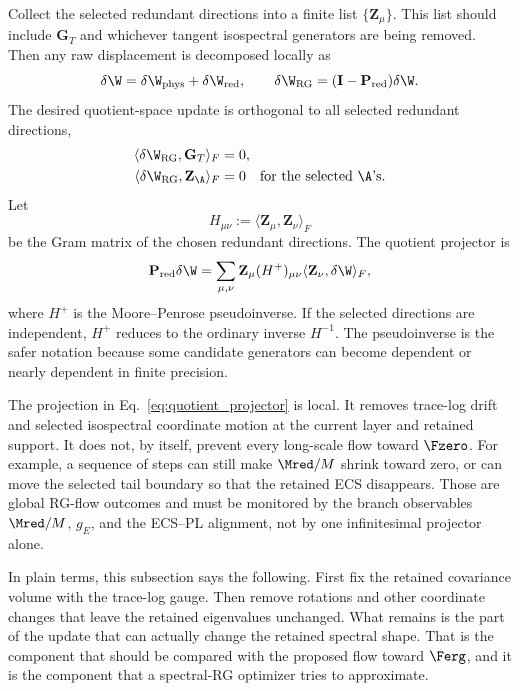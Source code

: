 Collect the selected redundant directions into a finite list \(\{\mathbf Z_{\mu}\}\).  This list should include \(\mathbf G_T\) and whichever tangent isospectral generators are being removed.  Then any raw displacement is decomposed locally as
\begin{equation}
  \delta\W
  =
  \delta\W_{\rm phys}
  +
  \delta\W_{\rm red},
  \qquad
  \delta\W_{\rm RG}
  =
  (\mathbf I-\mathbf P_{\rm red})\delta\W .
  \label{eq:local_RG_decomposition}
\end{equation}
The desired quotient-space update is orthogonal to all selected redundant directions,
\begin{equation}
\begin{aligned}
  \langle\delta\W_{\rm RG},\mathbf G_T\rangle_F&=0,\\
  \langle\delta\W_{\rm RG},\mathbf Z_{\A}\rangle_F&=0
  \quad\text{for the selected }\A\text{'s}.
\end{aligned}
  \label{eq:physical_update_orthogonality}
\end{equation}
Let
\begin{equation}
  H_{\mu\nu}
  :=
  \langle\mathbf Z_{\mu},\mathbf Z_{\nu}\rangle_F
  \label{eq:redundant_gram_matrix}
\end{equation}
be the Gram matrix of the chosen redundant directions.  The quotient projector is
\begin{equation}
  \mathbf P_{\rm red}\delta\W
  =
  \sum_{\mu,\nu}
  \mathbf Z_{\mu}(H^{+})_{\mu\nu}
  \langle\mathbf Z_{\nu},\delta\W\rangle_F,
  \label{eq:quotient_projector}
\end{equation}
where \(H^+\) is the Moore--Penrose pseudoinverse.  If the selected directions are independent, \(H^+\) reduces to the ordinary inverse \(H^{-1}\).  The pseudoinverse is the safer notation because some candidate generators can become dependent or nearly dependent in finite precision.

The projection in Eq.~\eqref{eq:quotient_projector} is local.  It removes trace-log drift and selected isospectral coordinate motion at the current layer and retained support.  It does not, by itself, prevent every long-scale flow toward \(\Fzero\).  For example, a sequence of steps can still make \(\Mred/M\) shrink toward zero, or can move the selected tail boundary so that the retained ECS disappears.  Those are global RG-flow outcomes and must be monitored by the branch observables \(\Mred/M\), \(g_E\), and the ECS--PL alignment, not by one infinitesimal projector alone.

In plain terms, this subsection says the following.  First fix the retained covariance volume with the trace-log gauge.  Then remove rotations and other coordinate changes that leave the retained eigenvalues unchanged.  What remains is the part of the update that can actually change the retained spectral shape.  That is the component that should be compared with the proposed flow toward \(\Ferg\), and it is the component that a spectral-RG optimizer tries to approximate.

